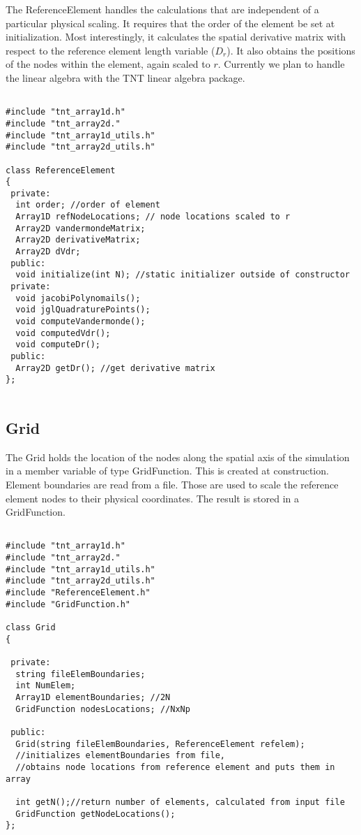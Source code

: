 \documentclass{article}
\begin{document}
The ReferenceElement handles the calculations that are independent of
a particular physical scaling. It requires that the order of the
element be set at initialization. Most interestingly, it calculates the
spatial derivative matrix with respect to the reference element length
variable ($D_r$). It also obtains the positions of the nodes within
the element, again scaled to $r$. Currently we plan to handle the linear algebra with the TNT linear algebra package.
\begin{verbatim}

#include "tnt_array1d.h"
#include "tnt_array2d."
#include "tnt_array1d_utils.h"
#include "tnt_array2d_utils.h"

class ReferenceElement
{
 private:
  int order; //order of element
  Array1D refNodeLocations; // node locations scaled to r
  Array2D vandermondeMatrix; 
  Array2D derivativeMatrix;
  Array2D dVdr;
 public:
  void initialize(int N); //static initializer outside of constructor
 private:
  void jacobiPolynomails();
  void jglQuadraturePoints();
  void computeVandermonde();
  void computedVdr();
  void computeDr();
 public:
  Array2D getDr(); //get derivative matrix
};
  
\end{verbatim}

\subsection{Grid}


The Grid holds the location of the nodes along the spatial axis of the
simulation in a member variable of type GridFunction. This is created
at construction. Element boundaries are read from a file. Those are used to
scale the reference element nodes to their physical coordinates. The result is
stored in a GridFunction. 


\begin{verbatim}

#include "tnt_array1d.h"
#include "tnt_array2d."
#include "tnt_array1d_utils.h"
#include "tnt_array2d_utils.h"
#include "ReferenceElement.h"
#include "GridFunction.h"

class Grid
{

 private:
  string fileElemBoundaries;
  int NumElem;
  Array1D elementBoundaries; //2N
  GridFunction nodesLocations; //NxNp

 public:
  Grid(string fileElemBoundaries, ReferenceElement refelem);
  //initializes elementBoundaries from file,
  //obtains node locations from reference element and puts them in array

  int getN();//return number of elements, calculated from input file
  GridFunction getNodeLocations();  
};


\end{verbatim}
\end{document}
